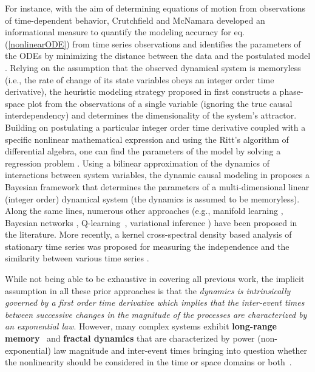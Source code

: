 For instance, with the aim of determining equations of motion from observations of time-dependent behavior, Crutchfield and McNamara  developed an informational measure to quantify the modeling accuracy for eq. (\ref{nonlinearODE}) from time series observations and identifies the parameters of the ODEs by minimizing the distance between the data and the postulated model \cite{crutchfield1987}. Relying on the assumption that the observed dynamical system is memoryless (i.e., the rate of change of its state variables obeys an integer order time derivative), the heuristic modeling strategy proposed in \cite{Packard1980} first constructs a phase-space plot from the observations of a single variable (ignoring the true causal interdependency) and determines the dimensionality of the system's attractor. Building on postulating a particular integer order time derivative coupled with a specific nonlinear mathematical expression and using the Ritt's algorithm of differential algebra, one can find the parameters of the model by solving a regression problem \cite{Ljung1994global}. Using a bilinear approximation of the dynamics of interactions between system variables, the dynamic causal modeling in \cite{Friston2003} proposes a Bayesian framework that determines the parameters of a multi-dimensional linear (integer order) dynamical system (the dynamics is assumed to be memoryless). Along the same lines, numerous other approaches (e.g., manifold learning \cite{Ohlsson2008}, Bayesian networks \cite{Chiuso2016}, Q-learning~{\cite{mehta2009q}}, variational inference \cite{Opper2008}) have been proposed in the literature. More recently, a kernel cross-spectral density based analysis of stationary time series was proposed for measuring the independence and the similarity between various time series \cite{Besserve2013}. 

While not being able to be exhaustive in covering all previous work, the implicit assumption in all these prior approaches is that the \textit{dynamics is intrinsically governed by a first order time derivative which implies that the inter-event times between successive changes in the magnitude of the processes are characterized by an exponential law}. However, many complex systems exhibit \textbf{long-range memory}~\cite{svenkeson2016spectral} and \textbf{fractal dynamics} that are characterized by power (non-exponential) law magnitude and inter-event times bringing into question whether the nonlinearity should be considered in the time or space domains or both~\cite{shlesinger1993strange,bassingthwaighte1994properties,west2012fractal,bogdan2015mathematical}.  

